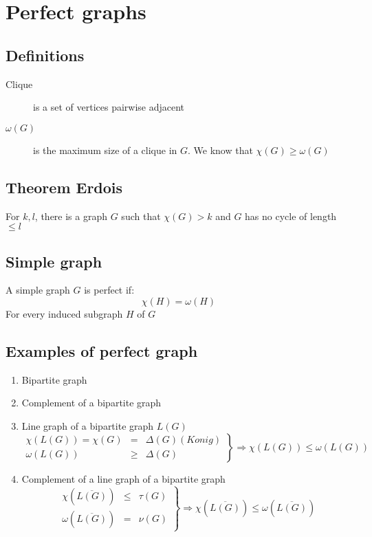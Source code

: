     \section{Perfect graphs}
        \subsection{Definitions}
            \begin{description}
                \item[Clique] is a set of vertices pairwise adjacent
                \item[$\omega(G)$] is the maximum size of a clique in $G$. We know that $\chi(G)\geq\omega(G)$
            \end{description}
        \subsection{Theorem Erdois}
            For $k, l$, there is a graph $G$ such that $\chi(G)>k$ and $G$ has no cycle of length $\leq l$
        \subsection{Simple graph}
            A simple graph $G$ is perfect if:\\
            \[
                \chi(H)=\omega(H)
            \]
            For every induced subgraph $H$ of $G$
        \subsection{Examples of perfect graph}
            \begin{enumerate}
                \item Bipartite graph
                \item Complement of a bipartite graph\\
                \item Line graph of a bipartite graph $L(G)$\\
                    \[
                   \left.
                       \begin{array}{lcr}
                            \chi(L(G))=\chi(G)&=& \Delta(G)(Konig)\\
                            \omega(L(G)) &\geq& \Delta(G)
                        \end{array}
                    \right\} \Rightarrow \chi(L(G))\leq\omega(L(G))
                \]
                \item Complement of a line graph of a bipartite graph
                    \[
                   \left.
                       \begin{array}{lcr}
                           \chi(\overline{L(G)}) &\leq& \tau(G)\\
                           \omega(\overline{L(G)}) &=& \nu(G)
                        \end{array}
                    \right\} \Rightarrow \chi(\overline{L(G)})\leq\omega(\overline{L(G)})
                \]
            \end{enumerate}
